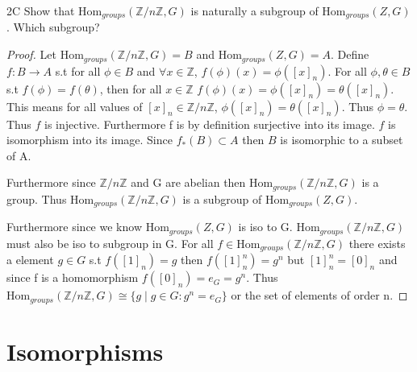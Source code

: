 \documentclass{article}
\newcommand{\Z}{\mathbb{Z}}
\newcommand{\Hom}[0]{\text{Hom}}
\begin{document}
\begin{claim}{2C}
    Show that $\Hom_{groups}(\Z/n\Z,G)$ is naturally a subgroup of $\Hom_{groups}(Z,G)$. Which subgroup?
\end{claim}
\begin{proof}

    Let $\Hom_{groups}(\Z/n\Z,G) = B$ and $\Hom_{groups}(Z,G) = A$. Define $f: B \to A$ s.t for all $\phi \in B$ and $\forall x \in \Z$, $f(\phi)(x) = \phi([x]_n)$. For all $\phi, \theta \in B$ s.t $f(\phi) = f(\theta)$, then for all $x \in \Z$ $f(\phi)(x) = \phi([x]_n) = \theta([x]_n)$. This means for all values of $[x]_n \in \Z/n\Z$, $\phi([x]_n) = \theta([x]_n)$. Thus $\phi = \theta$. Thus $f$ is injective. Furthermore f is by definition surjective into its image. $f$ is isomorphism into its image. Since $f_*(B) \subset A$ then $B$ is isomorphic to a subset of A.
    
    Furthermore since $\Z/n\Z$ and G are abelian then $\Hom_{groups}(\Z/n\Z,G) $ is a group. Thus $\Hom_{groups}(\Z/n\Z,G)$ is a subgroup of $\Hom_{groups}(Z,G)$. 


    Furthermore since we know $\Hom_{groups}(Z,G)$ is iso to G. $\Hom_{groups}(\Z/n\Z,G)$ must also be iso to subgroup in G. For all $f \in \Hom_{groups}(\Z/n\Z,G)$ there exists a element $g \in G$ s.t $f([1]_n) = g$ then $f([1]_n^n) = g^n$ but $[1]_n^n = [0]_n$ and since f is a homomorphism $f([0]_n) = e_G = g^n$. Thus $\Hom_{groups}(\Z/n\Z,G) \cong \{g \mid g \in G : g^n = e_G\}$ or the set of elements of order n.
\end{proof}

\bigskip

\section*{Isomorphisms}
\end{document}
